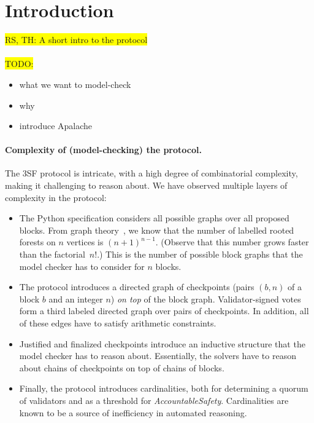 
\section{Introduction}

\colorbox{yellow}{RS, TH: A short intro to the protocol}

\paragraph{}\colorbox{yellow}{TODO:}

\begin{itemize}
  \item what we want to model-check
  \item why \tlap{}
  \item introduce Apalache
\end{itemize}

\paragraph{Complexity of (model-checking) the protocol.} The 3SF protocol is
intricate, with a high degree of combinatorial complexity, making it challenging
to reason about. We have observed multiple layers of complexity in the protocol:
\begin{itemize}
  \item The Python specification considers all possible graphs over all proposed
    blocks. From graph theory~\cite{cayley1878theorem}, we know that the number
    of labelled rooted forests on $n$ vertices is ${(n+1)}^{n-1}$. (Observe that
    this number grows faster than the factorial~$n!$.) This is the number of
    possible block graphs that the model checker has to consider for $n$ blocks.
  \item The protocol introduces a directed graph of checkpoints (pairs $(b,n)$
    of a block $b$ and an integer $n$) \emph{on top} of the block graph.
    Validator-signed votes form a third labeled directed graph over pairs of
    checkpoints. In addition, all of these edges have to satisfy arithmetic
    constraints.
  \item Justified and finalized checkpoints introduce an inductive structure
    that the model checker has to reason about. Essentially, the solvers have to
    reason about chains of checkpoints on top of chains of blocks.
  \item Finally, the protocol introduces cardinalities, both for determining a
    quorum of validators and as a threshold for \textit{AccountableSafety}.
    Cardinalities are known to be a source of inefficiency in automated
    reasoning.
\end{itemize}

